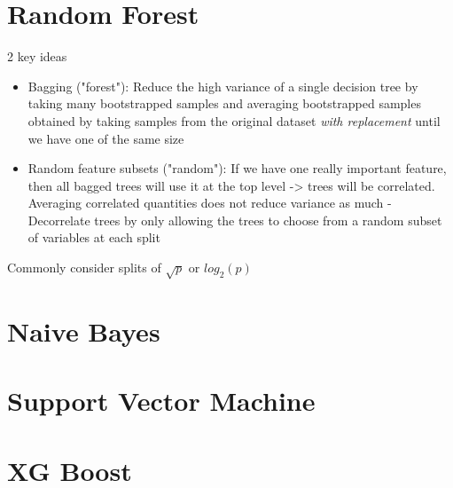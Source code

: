 \documentclass{article}
\begin{document}
\section{Random Forest}
2 key ideas
\begin{itemize}
	\item Bagging ("forest"): Reduce the high variance of a single decision tree by taking many bootstrapped samples and averaging bootstrapped samples obtained by taking samples 	from the original dataset \textit{with replacement} until we have one of the same size
	\item Random feature subsets ("random"): If we have one really important feature, then all bagged trees will use it at the top level -> trees will be correlated. Averaging correlated 		quantities does not reduce variance as much
		- Decorrelate trees by only allowing the trees to choose from a random subset of variables at each split
\end{itemize}

Commonly consider splits of $\sqrt{p}$ or $log_2(p)	$

\section{Naive Bayes}

\section{Support Vector Machine}

\section{XG Boost}
\end{document}
